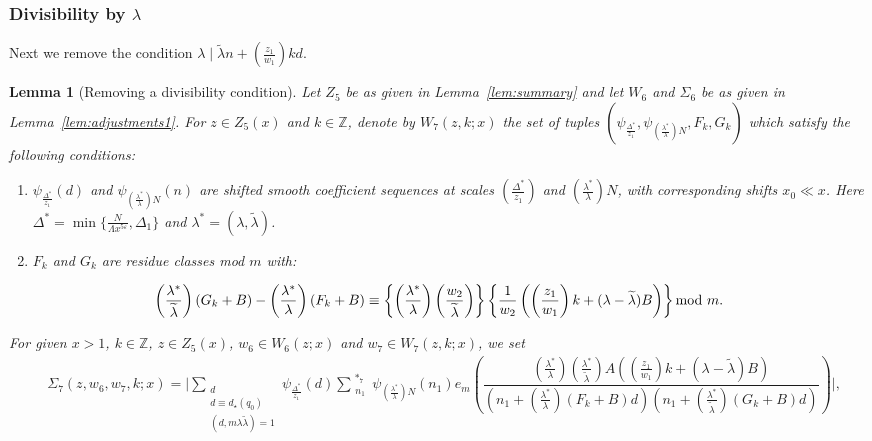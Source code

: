 \documentclass{amsart}
\newtheorem{lemma}{Lemma}
\numberwithin{equation}{section}
\begin{document}
\subsubsection{Divisibility by $\lambda$} 
Next we remove the condition $\lambda \mid \widetilde{\lambda} n +(\frac{z_1}{w_1})kd$.  


\begin{lemma}[Removing a divisibility condition]\label{lem:adjustments2a} Let $Z_5$  be as given in Lemma~{\rm\ref{lem:summary}}  and let $W_6$ and  $\Sigma_6$ be as given in   Lemma~{\rm\ref{lem:adjustments1}}. For $z \in Z_5(x)$ and $k \in \mathbb{Z}$, denote by $W_7(z,k;x)$ the set of tuples
$
(\psi_{\frac{\Delta^*}{z_1}}, \psi_{(\frac{\lambda^*}{\lambda})N},  F_k, G_k)
$
which satisfy the following conditions: 
\begin{enumerate}[{\rm (i)}]
\item $\psi_{\frac{\Delta^*}{z_1}}(d)$  and $ \psi_{(\frac{\lambda^*}{\lambda})N}(n)$ are shifted smooth coefficient sequences at scales $(\frac{\Delta^*}{z_1}) $ and   $(\frac{\lambda^*}{\lambda})N$, with corresponding shifts $x_0 \ll x$.  Here  $\Delta^* = \min\{\frac{N}{\Lambda x^{5\varepsilon}}, \Delta_1\}$  and $\lambda^* = (\lambda, \widetilde{\lambda})$. 
\item $F_k$ and $G_k$ are residue classes mod $m$ with: 
\end{enumerate}
\begin{align} \label{equ:relationshipFG}
 \left( \frac{\lambda^*}{\widetilde{\lambda}}\right)(G_k+B) -\left(\frac{\lambda^*}{\lambda}\right) (F_k +B ) \equiv \left\{\left(\frac{\lambda^*}{\lambda }\right)\left(\frac{w_2}{ \widetilde{\lambda}}\right)\right\}\left\{\dfrac{1}{w_2}\left(\left(\frac{z_1}{w_1}\right)k + (\lambda-\widetilde{\lambda})B\right)\right\} \mbox{\rm  mod } m.
\end{align}

\vspace{3mm}
For given $x>1$, $k \in \mathbb{Z}$,  $z \in Z_5(x)$, $w_6 \in W_6(z;x)$ and $w_7 \in W_7(z,k;x)$,  
  we set 
 \begin{align*}
&\Sigma_7(z,w_6,w_7,k;x) =  \Bigg|\!\! \sum_{\substack{d \\ d \equiv d_\star (q_0) \\  (d, m \lambda \widetilde{\lambda})=1 }} \!\!\!\!\psi_{\frac{\Delta^*}{z_1}}(d) \sum_{\substack{n_1  }}^{\,\,*_7} \psi_{(\frac{\lambda^*}{\lambda})N}(n_1)
e_{m}\!\!\left(\dfrac{(\frac{\lambda^*}{\lambda})(\frac{\lambda^*}{\widetilde{\lambda}})A ((\frac{z_1}{w_1}) k   +  (\lambda-\widetilde{\lambda})B)}{(n_1 + (\frac{\lambda^*}{\lambda}) (F_k +B )d)( n_1 + ( \frac{\lambda^*}{\widetilde{\lambda}})(G_k+B) d)}\right) \Bigg|,
\end{align*} 


\end{lemma}
\end{document}
